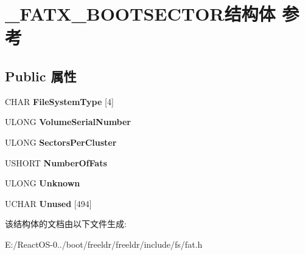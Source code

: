 \hypertarget{struct___f_a_t_x___b_o_o_t_s_e_c_t_o_r}{}\section{\+\_\+\+F\+A\+T\+X\+\_\+\+B\+O\+O\+T\+S\+E\+C\+T\+O\+R结构体 参考}
\label{struct___f_a_t_x___b_o_o_t_s_e_c_t_o_r}
\subsection*{Public 属性}
\begin{DoxyCompactItemize}
\item 
\mbox{\label{struct___f_a_t_x___b_o_o_t_s_e_c_t_o_r_afe38cd18678498e66df31c1cc78171eb}} 
C\+H\+AR {\bfseries File\+System\+Type} \mbox{[}4\mbox{]}
\item 
\mbox{\label{struct___f_a_t_x___b_o_o_t_s_e_c_t_o_r_a28d82fb58ffb139fdd53ee9e65e36cea}} 
U\+L\+O\+NG {\bfseries Volume\+Serial\+Number}
\item 
\mbox{\label{struct___f_a_t_x___b_o_o_t_s_e_c_t_o_r_a8cb23ee8fccc084c36105f30f032f5a9}} 
U\+L\+O\+NG {\bfseries Sectors\+Per\+Cluster}
\item 
\mbox{\label{struct___f_a_t_x___b_o_o_t_s_e_c_t_o_r_af7196a011a19e66740b3a5d60b00f326}} 
U\+S\+H\+O\+RT {\bfseries Number\+Of\+Fats}
\item 
\mbox{\label{struct___f_a_t_x___b_o_o_t_s_e_c_t_o_r_a93f967b9114e1fe1504156cc8db8b11b}} 
U\+L\+O\+NG {\bfseries Unknown}
\item 
\mbox{\label{struct___f_a_t_x___b_o_o_t_s_e_c_t_o_r_a57a3c052ef22204e8d25a40554e637c5}} 
U\+C\+H\+AR {\bfseries Unused} \mbox{[}494\mbox{]}
\end{DoxyCompactItemize}


该结构体的文档由以下文件生成\+:\begin{DoxyCompactItemize}
\item 
E\+:/\+React\+O\+S-\/0../boot/freeldr/freeldr/include/fs/fat.\+h\end{DoxyCompactItemize}
